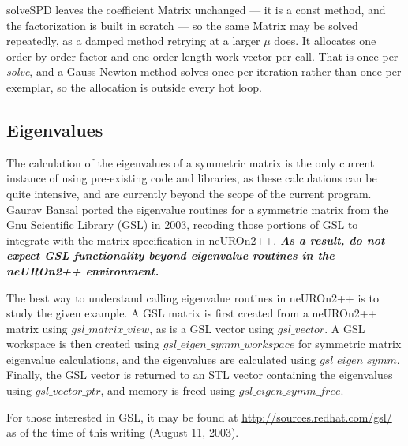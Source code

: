 \documentclass{report}
\def\beginred{\color{red}}
\def\endcolor{\color{black}}
\begin{document}
solveSPD leaves the coefficient Matrix unchanged --- it is a const method, and
the factorization is built in scratch --- so the same Matrix may be solved
repeatedly, as a damped method retrying at a larger $\mu$ does.  It allocates one
order-by-order factor and one order-length work vector per call.  That is once
per {\em solve}, and a Gauss-Newton method solves once per iteration rather than
once per exemplar, so the allocation is outside every hot loop.


\subsection{Eigenvalues}

The calculation of the eigenvalues of a symmetric matrix is the only
current instance of using pre-existing code and libraries, as these
calculations can be quite intensive, and are currently beyond the
scope of the current program.  Gaurav Bansal ported the eigenvalue
routines for a symmetric matrix from the Gnu Scientific Library (GSL)
in 2003, recoding those portions of GSL to integrate with the matrix
specification in neUROn2++.  {\em \bf \beginred As a result, do not
expect GSL functionality beyond eigenvalue routines in the neUROn2++
environment. \endcolor \bf \em}

The best way to understand calling eigenvalue routines in neUROn2++ is
to study the given example.  A GSL matrix is first created from a
neUROn2++ matrix using $gsl\_matrix\_view$, as is a GSL vector using
$gsl\_vector$. A GSL workspace is then created using
$gsl\_eigen\_symm\_workspace$ for symmetric matrix eigenvalue
calculations, and the eigenvalues are calculated using
$gsl\_eigen\_symm$.  Finally, the GSL vector is returned to an STL
vector containing the eigenvalues using $gsl\_vector\_ptr$, and memory
is freed using $gsl\_eigen\_symm\_free$.

For those interested in GSL, it may be found at
\href{http://sources.redhat.com/gsl/}{http://sources.redhat.com/gsl/}
 as of the time of this writing (August 11, 2003).
\end{document}
